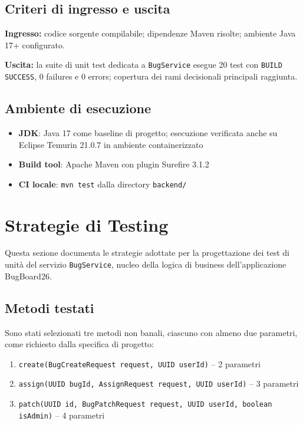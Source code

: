 ﻿\documentclass[a4paper,11pt]{article}
\begin{document}
\subsection{Criteri di ingresso e uscita}

\textbf{Ingresso:} codice sorgente compilabile; dipendenze Maven risolte; ambiente Java 17+ configurato.

\textbf{Uscita:} la suite di unit test dedicata a \texttt{BugService} esegue 20 test con \texttt{BUILD SUCCESS}, 0 failures e 0 errors; copertura dei rami decisionali principali raggiunta.

\subsection{Ambiente di esecuzione}
\begin{itemize}
  \item \textbf{JDK}: Java 17 come baseline di progetto; esecuzione verificata anche su Eclipse Temurin 21.0.7 in ambiente containerizzato
  \item \textbf{Build tool}: Apache Maven con plugin Surefire 3.1.2
  \item \textbf{CI locale}: \texttt{mvn test} dalla directory \texttt{backend/}
\end{itemize}

\section{Strategie di Testing}

Questa sezione documenta le strategie adottate per la progettazione dei test di unit\`a del servizio \texttt{BugService}, nucleo della logica di business dell'applicazione BugBoard26.

\subsection{Metodi testati}
Sono stati selezionati tre metodi non banali, ciascuno con almeno due parametri, come richiesto dalla specifica di progetto:

\begin{enumerate}
  \item \texttt{create(BugCreateRequest request, UUID userId)} -- 2 parametri
  \item \texttt{assign(UUID bugId, AssignRequest request, UUID userId)} -- 3 parametri
  \item \texttt{patch(UUID id, BugPatchRequest request, UUID userId, boolean isAdmin)} -- 4 parametri
\end{enumerate}
\end{document}
